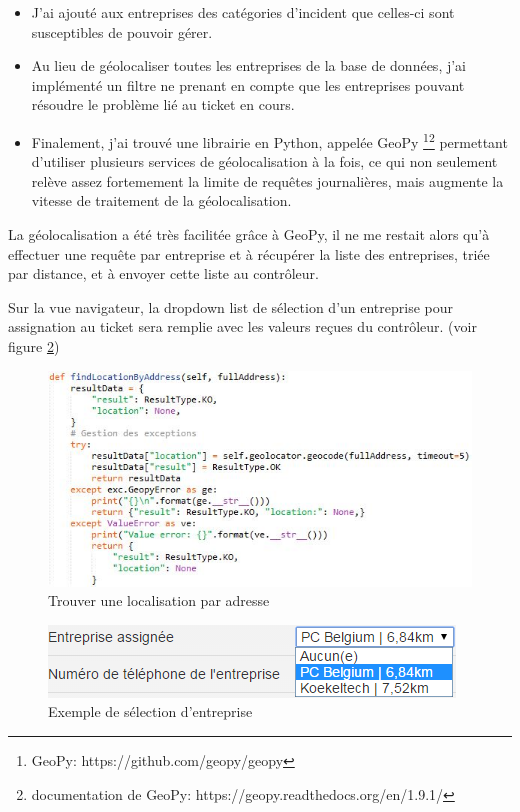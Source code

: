 \documentclass[12pt,table,a4paper]{report}
\begin{document}
\begin{itemize}
	\item {J'ai ajouté aux entreprises des catégories d'incident que celles-ci sont susceptibles de pouvoir gérer.}
	\item {Au lieu de géolocaliser toutes les entreprises de la base de données, j'ai implémenté un filtre ne prenant en compte que les entreprises pouvant résoudre le problème lié au ticket en cours.}
	\item {Finalement, j'ai trouvé une librairie en Python, appelée GeoPy \footnote{GeoPy: https://github.com/geopy/geopy}\footnote{documentation de GeoPy: https://geopy.readthedocs.org/en/1.9.1/} permettant d'utiliser plusieurs services de géolocalisation à la fois, ce qui non seulement relève assez fortemement la limite de requêtes journalières, mais augmente la vitesse de traitement de la géolocalisation.}
\end{itemize}

La géolocalisation a été très facilitée grâce à GeoPy, il ne me restait alors qu'à effectuer une requête par entreprise et à récupérer la liste des entreprises, triée par distance, et à envoyer cette liste au contrôleur.

Sur la vue navigateur, la dropdown list de sélection d'un entreprise pour assignation au ticket sera remplie avec les valeurs reçues du contrôleur. (voir figure \ref{fig:dropdown-selection-entreprise})

\begin{figure}[hb]
	\centering
		\includegraphics{images/code-snippets/geolocalisation-findlocationbyaddress.JPG}
	\caption{Trouver une localisation par adresse}
	\label{fig:geolocalisation-findlocationbyaddress}
\end{figure}

\begin{figure}[hb]
\centering
\includegraphics{images/screenshots/web/dropdown-selection-entreprise.png}
\caption{Exemple de sélection d'entreprise}
\label{fig:dropdown-selection-entreprise}
\end{figure}
\end{document}
